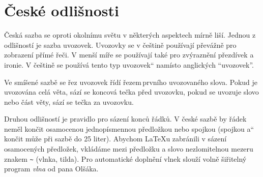 \documentclass[11pt,a4paper,twocolumn]{article}
\providecommand{\uv}[1]{\quotedblbase #1\textquotedblleft}
\begin{document}
\section{České odlišnosti}
Česká sazba se oproti okolnímu světu v některých aspektech mírně liší. Jednou z odlišností je sazba uvozovek. Uvozovky se v češtině používají převážně pro zobrazení přímé řeči. V menší míře se používají také pro zvýraznění přezdívek a ironie. V češtině se používá tento typ \uv{uvozovek} namísto anglických ``uvozovek''.\par
Ve smíšené sazbě se řez uvozovek řídí řezem\,první\-ho uvozovaného slova. Pokud je uvozována celá věta, sází se koncová tečka před uvozovku, pokud se uvozuje slovo nebo část věty, sází se tečka za uvozovku.\par
Druhou odlišností je pravidlo pro sázení konců řádků. V české sazbě by řádek neměl končit osamocenou jednopísmennou předložkou nebo spojkou (spojkou \uv{a} končit může při sazbě do 25 liter). Abychom \LaTeX u zabránili v sázení osamocených předložek, vkládáme mezi předložku a slovo nezlomitelnou mezeru znakem \verb;~; (vlnka, tilda). Pro automatické doplnění vlnek slouží volně šiřitelný program \emph{vlna} od pana Olšáka\footnotemark.
\end{document}
